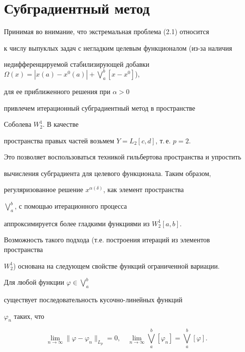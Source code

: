 \section{Субградиентный метод}





Принимая во внимание, что экстремальная проблема (2.1) относится


к числу выпуклых задач с негладким целевым функционалом (из-за наличия


недифференцируемой стабилизирующей добавки $\Omega(x) = |x(a) - x^0(a)|


+ \bigvee\limits_a^b[x-x^0]$),


для ее приближенного решения при $\alpha>0$ 


привлечем итерационный субградиентный метод в пространстве


Соболева $W_2^1$. В качестве


пространства правых частей возьмем $Y = L_2[c,d]$, т.\,е. $p=2$.


Это позволяет воспользоваться техникой гильбертова пространства и упростить


вычисления субградиента для целевого функционала. Таким образом,


регуляризованное решение $x^{\alpha(\delta)} $, как элемент пространства


$\bigvee\limits_a^b$, с помощью итерационного процесса


аппроксимируется более гладкими функциями из $W_2^1[a,b]$.





Возможность такого подхода (т.е. построения итераций из элементов пространства


$W_2^1$) основана на следующем свойстве функций ограниченной вариации.





\begin{lems}


Для любой функции $\varphi\in \bigvee\limits_a^b$


существует последовательность кусочно-линейных функций


$\varphi_n$ таких, что


$$


\lim_{n \to \infty} \| \varphi - \varphi_n \|_{L_p} = 0,\quad


\lim_{n \to \infty}


\bigvee\limits_a^b[ \varphi_n ] =


\bigvee\limits_a^b[ \varphi ].


$$


\end{lems}





